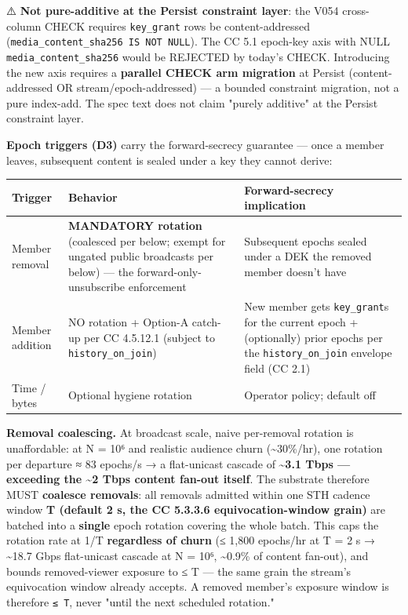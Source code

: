 \documentclass[11pt]{article}
\begin{document}
⚠️ \textbf{Not pure-additive at the Persist constraint layer}: the V054 cross-column CHECK requires \texttt{key\_grant} rows be content-addressed (\texttt{media\_content\_sha256 IS NOT NULL}). The CC 5.1 epoch-key axis with NULL \texttt{media\_content\_sha256} would be REJECTED by today's CHECK. Introducing the new axis requires a \textbf{parallel CHECK arm migration} at Persist (content-addressed OR stream/epoch-addressed) — a bounded constraint migration, not a pure index-add. The spec text does not claim "purely additive" at the Persist constraint layer.


\textbf{Epoch triggers (D3)} carry the forward-secrecy guarantee — once a member leaves, subsequent content is sealed under a key they cannot derive:


{\footnotesize
\begin{longtable}{|p{5.33cm}|p{5.33cm}|p{5.33cm}|}\hline
\textbf{Trigger} & \textbf{Behavior} & \textbf{Forward-secrecy implication} \\ \hline\endhead
Member removal & \textbf{MANDATORY rotation} (coalesced per below; exempt for ungated public broadcasts per below) — the forward-only-unsubscribe enforcement & Subsequent epochs sealed under a DEK the removed member doesn't have \\ \hline
Member addition & NO rotation + Option-A catch-up per CC 4.5.12.1 (subject to \texttt{history\_on\_join}) & New member gets \texttt{key\_grant}s for the current epoch + (optionally) prior epochs per the \texttt{history\_on\_join} envelope field (CC 2.1) \\ \hline
Time / bytes & Optional hygiene rotation & Operator policy; default off \\ \hline
\end{longtable}}


\textbf{Removal coalescing.} At broadcast scale, naive per-removal rotation is unaffordable: at N = 10⁶ and realistic audience churn (\textasciitilde{}30\%/hr), one rotation per departure ≈ 83 epochs/s → a flat-unicast cascade of \textbf{\textasciitilde{}3.1 Tbps — exceeding the \textasciitilde{}2 Tbps content fan-out itself}. The substrate therefore MUST \textbf{coalesce removals}: all removals admitted within one STH cadence window \textbf{T (default 2 s, the CC 5.3.3.6 equivocation-window grain)} are batched into a \textbf{single} epoch rotation covering the whole batch. This caps the rotation rate at 1/T \textbf{regardless of churn} (≤ 1,800 epochs/hr at T = 2 s → \textasciitilde{}18.7 Gbps flat-unicast cascade at N = 10⁶, \textasciitilde{}0.9\% of content fan-out), and bounds removed-viewer exposure to ≤ T — the same grain the stream's equivocation window already accepts. A removed member's exposure window is therefore \texttt{≤ T}, never "until the next scheduled rotation."
\end{document}
